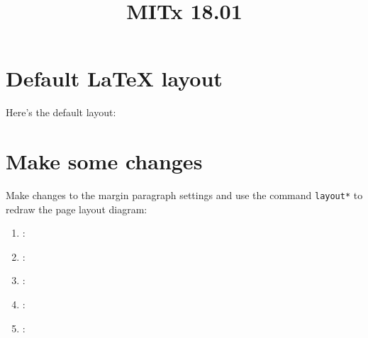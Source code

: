 \documentclass{report}
\title{MITx 18.01}
\begin{document}
\section{Default \LaTeX{} layout}
Here's the default layout:

\layout
\section{Make some changes}
Make changes to the margin paragraph settings and use the command \verb|layout*| to redraw the page layout diagram:
\vspace{10pt}
\setlength{\marginparwidth}{0pt}
\setlength{\marginparsep}{0pt}

\layout*
\newcommand\printvalue[1]{\texttt{\string #1} : \the #1}
\begin{enumerate}[labelwidth=10pt,labelsep=2pt,itemindent=\labelwidth+\labelsep]
  \DrawEnumitemLabel\item \printvalue{}
  \item \printvalue{}
  \item \printvalue{}
  \item \printvalue\itemindent
  \item \printvalue\leftmargin
\end{enumerate}
\end{document}
